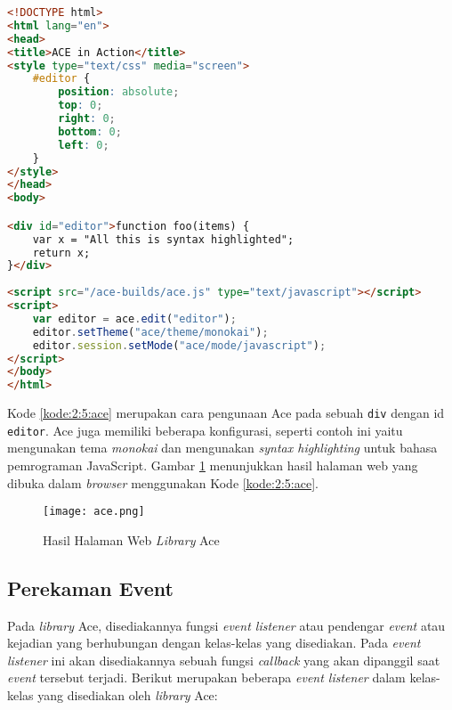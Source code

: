 \begin{lstlisting}[language={html}, caption={Contoh kode pengunaan Ace}, label={kode:2:5:ace}]
<!DOCTYPE html>
<html lang="en">
<head>
<title>ACE in Action</title>
<style type="text/css" media="screen">
	#editor { 
		position: absolute;
		top: 0;
		right: 0;
		bottom: 0;
		left: 0;
	}
</style>
</head>
<body>

<div id="editor">function foo(items) {
	var x = "All this is syntax highlighted";
	return x;
}</div>
	
<script src="/ace-builds/ace.js" type="text/javascript"></script>
<script>
	var editor = ace.edit("editor");
	editor.setTheme("ace/theme/monokai");
	editor.session.setMode("ace/mode/javascript");
</script>
</body>
</html>
\end{lstlisting}

Kode \ref{kode:2:5:ace} merupakan cara pengunaan Ace pada sebuah \texttt{div} dengan id \texttt{editor}. Ace juga memiliki beberapa konfigurasi, seperti contoh ini yaitu mengunakan tema \textit{monokai} dan mengunakan \textit{syntax highlighting} untuk bahasa pemrograman JavaScript. Gambar \ref{fig:2:5:ace} menunjukkan hasil halaman web yang dibuka dalam \textit{browser} menggunakan Kode \ref{kode:2:5:ace}.

\begin{figure}[H]
	\centering
	\texttt{[image: ace.png]}
	\caption{Hasil Halaman Web \textit{Library} Ace}
	\label{fig:2:5:ace}
	\vspace{-1cm}
\end{figure}

\subsection{Perekaman Event}

Pada \textit{library} Ace, disediakannya fungsi \textit{event listener} atau pendengar \textit{event} atau kejadian yang berhubungan dengan kelas-kelas yang disediakan. Pada \textit{event listener} ini akan disediakannya sebuah fungsi \textit{callback} yang akan dipanggil saat \textit{event} tersebut terjadi. Berikut merupakan beberapa \textit{event listener} dalam kelas-kelas yang disediakan oleh \textit{library} Ace:

